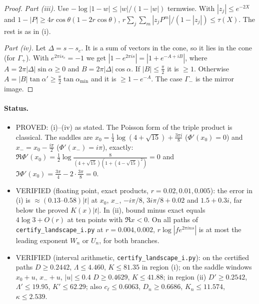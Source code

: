 \begin{proof}
\emph{Part \textup{(iii)}.} Use $-\log|1-w|\le|w|/(1-|w|)$ termwise. With $|z_j|\le e^{-2X}$ and
$1-|P|\ge4r\cos\theta(1-2r\cos\theta)$, $r\sum_j\sum_m|z_jP^m|/(1-|z_j|)\le\tau(X)$. The rest is as in (i).

\emph{Part \textup{(iv)}.} Let $\Delta=s-s_c$. It is a sum of vectors in the cone, so it lies in the cone
(for $\Gamma_+$). With $e^{2\pi is_c}=-1$ we get $|1-e^{2\pi is}|=|1+e^{-A+iB}|$, where $A=2\pi|\Delta|\sin\alpha\ge0$
and $B=2\pi|\Delta|\cos\alpha$. If $|B|\le\frac\pi2$ it is $\ge1$. Otherwise $A=|B|\tan\alpha'\ge\frac\pi2\tan\alpha_{\min}$
and it is $\ge1-e^{-A}$. The case $\Gamma_-$ is the mirror image.
\end{proof}

\paragraph{Status.}
\begin{itemize}
\item PROVED: (i)--(iv) as stated. The Poisson form of the triple product is classical. The saddles are
$x_0=\frac14\log(4+\sqrt{15})+\frac{3\pi i}8$ ($\Phi'(x_0)=0$) and $x_-=x_0-\frac{i\pi}2$ ($\Phi'(x_-)=i\pi$), exactly:
$\Re\Phi'(x_0)=\frac12\log\frac{8}{(4+\sqrt{15})(1+(4-\sqrt{15})^2)}=0$ and $\Im\Phi'(x_0)=\frac{3\pi}4-2\cdot\frac{3\pi}8=0$.
\item VERIFIED (floating point, exact products, $r=0.02,0.01,0.005$): the error in (i) is $\approx(0.13\text{--}0.58)|t|$
at $x_0$, $x_-$, $-i\pi/8$, $3i\pi/8+0.02$ and $1.5+0.3i$, far below the proved $K(x)|t|$. In (ii), bound minus
exact equals $4\log3+O(r)$ at ten points with $\Re x<0$. On all paths of \texttt{certify\_landscape\_i.py}
at $r=0.004,0.002$, $r\log|fe^{2\pi ins}|$ is at most the leading exponent $W_n$ or $U_n$, for both branches.
\item VERIFIED (interval arithmetic, \texttt{certify\_landscape\_i.py}): on the certified paths
$D\ge0.2442$, $\Lambda\le4.460$, $K\le81.35$ in region (i); on the saddle windows
$x_0+u$, $x_-+u$, $|u|\le0.4$ $D\ge0.4629$, $K\le41.88$; in region (ii) $D'\ge0.2542$,
$\Lambda'\le19.95$, $K'\le62.29$; also $c_\ell\le0.6063$, $D_n\ge0.6686$, $K_n\le11.574$, $\kappa\le2.539$.
\end{itemize}


